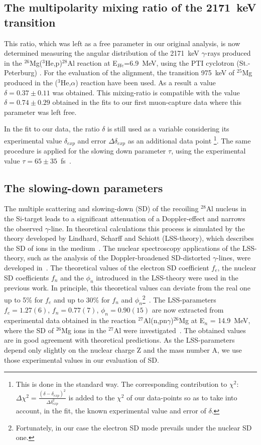\subsection{The multipolarity mixing ratio of the 2171~keV transition}

This ratio, which was left as a free parameter in our original analysis,
is now
determined  measuring the angular distribution of the 2171~keV
$\gamma$-rays
produced in the $^{26}$Mg($^3$He,p)$^{28}$Al reaction at
E$_{He}$=6.9~MeV, using
the
PTI cyclotron (St.-Peterburg) \cite{Kudoyarov96}. For the evaluation of
the alignment, the transition 975~keV of $^{25}$Mg produced in the
($^3$He,$\alpha$) reaction have been used.
As a result a value  $\delta = 0.37 \pm 0.11$ was obtained. 
This mixing-ratio is compatible with the value $\delta = 0.74 \pm 0.29 $
obtained in the fits to our first muon-capture data where this
parameter was left free.

In the fit to our data, the ratio $\delta$ is still used as a variable
considering 
its experimental value $\delta_{exp}$ and error
$\Delta\delta_{exp}$
as an additional data point
\footnote{This is done in
the standard way. 
The corresponding contribution to $\chi^2$: 
$\Delta \chi^2 = \frac{(\delta - \delta_{exp})^2}{\Delta
\delta_{exp}^2}$ 
is added to the $\chi^2$ of our data-points so as
to take into account, in the fit, the known experimental value and error
of $\delta$.}.
The same procedure is applied for the slowing down  parameter $\tau$,
using the experimental value $\tau = 65 \pm 35$~fs~\cite{Endt90}.

\subsection{The slowing-down parameters}
The multiple scattering and slowing-down (SD) of the recoiling $^{28}$Al
nucleus  
in the Si-target leads to a significant attenuation of a Doppler-effect
and narrows
the observed $\gamma$-line. In theoretical calculations this process is
simulated by the theory developed by Lindhard, Scharff and 
Schiott (LSS-theory), which describes the SD of ions in the 
medium~\cite[see also the ref. in~\ref{brud}]{Lindhard63}. The nuclear
spectroscopy applications of the LSS-theory, such as the analysis of the 
Doppler-broadened SD-distorted $\gamma$-lines, were developed 
in~\cite{Lemberg85,Georgieva89}. The theoretical
values of the electron SD coefficient  $f_e$, the nuclear SD
coefficients
$f_n$ and the $\phi_n$ introduced in the LSS-theory were used in the
previous work. 
In principle, this
theoretical values can deviate from the real one up to 5\% for $f_e$ and
up to 30\% for $f_n$ and $\phi_n$\footnote{Fortunately, in our case the
electron
SD mode  prevails under the nuclear SD one.}~\cite{Lemberg85}.
The LSS-parameters $f_e = 1.27(6)$, $f_n = 0.77(7)$,
$\phi_n = 0.90(15)$  are now extracted from experimental data obtained
in the
reaction $^{27}$Al(n,pn$\gamma$)$^{26}$Mg at E$_n$ = 14.9~MeV, where the
SD of $^{26}$Mg ions in the $^{27}$Al were
investigated~\cite{Pasternak92}. 
The obtained values
are in good agreement
with theoretical predictions. As the LSS-parameters depend
only slightly on the nuclear charge Z and the mass number A, 
  we use
those experimental values in our evaluation of SD.
 
